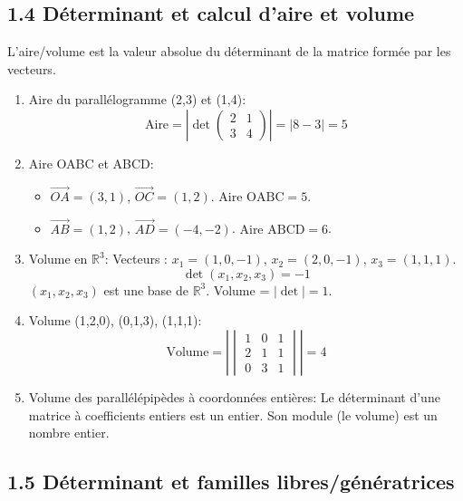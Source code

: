 \documentclass[french]{yLectureNote}
\renewcommand{\vec}{\overrightarrow}
\renewcommand{\vec}{\overrightarrow}
\begin{document}
\subsection{1.4 Déterminant et calcul d'aire et volume}

L'aire/volume est la valeur absolue du déterminant de la matrice formée par les vecteurs.

\begin{enumerate}
    \item[(a)] Aire du parallélogramme (2,3) et (1,4):
    $$\text{Aire} = \left| \det\begin{pmatrix} 2 & 1 \\ 3 & 4 \end{pmatrix} \right| = |8 - 3| = 5$$

    \item[(b)] Aire OABC et ABCD:
    \begin{itemize}
        \item $\vec{OA} = (3,1)$, $\vec{OC} = (1,2)$. $\text{Aire OABC} = 5$.
        \item $\vec{AB} = (1,2)$, $\vec{AD} = (-4,-2)$. $\text{Aire ABCD} = 6$.
    \end{itemize}

    \item[(c)] Volume en $\mathbb{R}^3$:
    Vecteurs : $x_1 = (1, 0, -1)$, $x_2 = (2, 0, -1)$, $x_3 = (1, 1, 1)$.
    $$\det(x_1, x_2, x_3) = -1$$
    $(x_1, x_2, x_3)$ est une base de $\mathbb{R}^3$. Volume = $|\det| = 1$.

    \item[(d)] Volume (1,2,0), (0,1,3), (1,1,1):
    $$\text{Volume} = \left| \begin{vmatrix}1&0&1\\ 2&1&1\\ 0&3&1\end{vmatrix} \right| = 4$$

    \item[(e)] Volume des parallélépipèdes à coordonnées entières:
    Le déterminant d'une matrice à coefficients entiers est un entier. Son module (le volume) est un nombre entier.
\end{enumerate}

\subsection{1.5 Déterminant et familles libres/génératrices}
\end{document}
